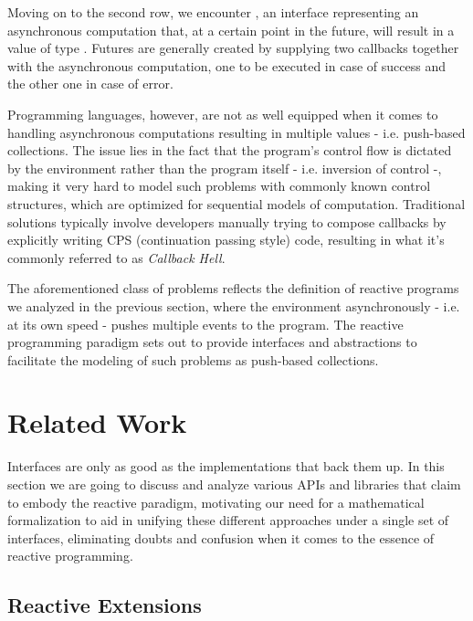 Moving on to the second row, we encounter , an interface representing an asynchronous computation that, at a certain point in the future, will result in a value of type . Futures are generally created by supplying two callbacks together with the asynchronous computation, one to be executed in case of success and the other one in case of error. 

Programming languages, however, are not as well equipped when it comes to handling asynchronous computations resulting in multiple values - i.e. push-based collections. The issue lies in the fact that the program's control flow is dictated by the environment rather than the program itself - i.e. inversion of control -, making it very hard to model such problems with commonly known control structures, which are optimized for sequential models of computation. Traditional solutions typically involve developers manually trying to compose callbacks by explicitly writing CPS (continuation passing style) code\cite{meijer2015spicing}, resulting in what it's commonly referred to as \textit{Callback Hell}\cite{edwards2009coherent}.

The aforementioned class of problems reflects the definition of reactive programs we analyzed in the previous section, where the environment asynchronously - i.e. at its own speed - pushes multiple events to the program. The reactive programming paradigm sets out to provide interfaces and abstractions to facilitate the modeling of such problems as push-based collections. 

\section{Related Work}

Interfaces are only as good as the implementations that back them up. In this section we are going to discuss and analyze various APIs and libraries that claim to embody the reactive paradigm, motivating our need for a mathematical formalization to aid in unifying these different approaches under a single set of interfaces, eliminating doubts and confusion when it comes to the essence of reactive programming. 


\subsection{Reactive Extensions}
\label{subsec:rx}

